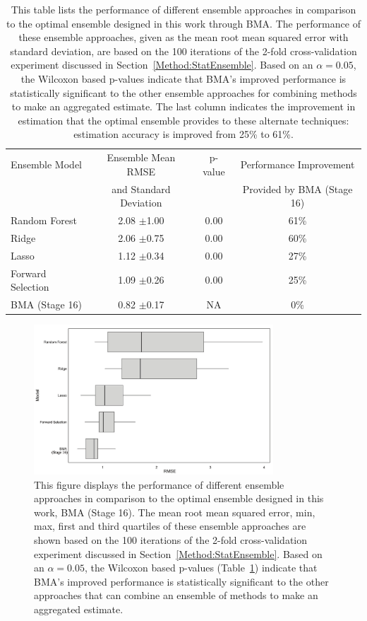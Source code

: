 \documentclass[12pt]{article}
\newcommand{\+}[1]{\ensuremath{\mathbf{#1}}}
\begin{document}
\begin{table}[h!]
	\centering
	\caption[Model comparison with mean RMSE]{This table lists the performance of different ensemble approaches in comparison to the optimal ensemble designed in this work through BMA. The performance of these ensemble approaches, given as the mean root mean squared error with standard deviation, are based on the 100 iterations of the 2-fold cross-validation experiment discussed in Section~\ref{Method:StatEnsemble}. Based on an $\alpha = 0.05$, the Wilcoxon based p-values indicate that BMA's improved performance is statistically significant to the other ensemble approaches for combining methods to make an aggregated estimate. The last column indicates the improvement in estimation that the optimal ensemble provides to these alternate techniques: estimation accuracy is improved from 25\% to 61\%. }
	\footnotesize
	\begin{tabular}{lccc}
		\hline
		\hline
		Ensemble Model  & Ensemble Mean RMSE  & p-value & Performance Improvement\\
		 & and Standard Deviation & & Provided by BMA (Stage 16)\\
		\hline
		Random Forest & 2.08 $\pm$1.00 & 0.00 & 61\%\\
		Ridge & 2.06 $\pm$0.75 & 0.00 & 60\%\\
		Lasso & 1.12 $\pm$0.34 & 0.00 & 27\%\\
		Forward Selection & 1.09 $\pm$0.26 & 0.00 &  25\%\\		
		BMA (Stage 16) & 0.82 $\pm$0.17 & NA & 0\%\\
			\hline
		\hline
	\end{tabular}
	\label{Analysis:Table4:EnsembleCompare}
\end{table}

\begin{figure}
	\centering
	\includegraphics[keepaspectratio,width=0.8\textwidth]{Figures/BMA_Xval_baselineModels_RMSE}
	\caption{This figure displays the performance of different ensemble approaches in comparison to the optimal ensemble designed in this work, BMA (Stage 16). The mean root mean squared error, min, max, first and third quartiles of these ensemble approaches are shown based on the 100 iterations of the 2-fold cross-validation experiment discussed in Section~\ref{Method:StatEnsemble}. Based on an $\alpha = 0.05$, the Wilcoxon based p-values (Table~\ref{Analysis:Table4:EnsembleCompare}) indicate that BMA's improved performance is statistically significant to the other approaches that can combine an ensemble of methods to make an aggregated estimate.}
	\label{Analysis:Figure6:Models}
\end{figure}
\end{document}
